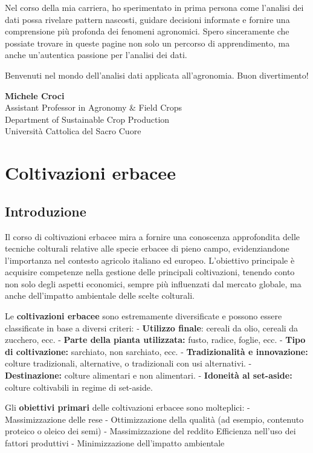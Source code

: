 \documentclass[
]{book}
\theoremstyle{definition}
\theoremstyle{definition}
\theoremstyle{definition}
\theoremstyle{definition}
\theoremstyle{remark}
\begin{document}
Nel corso della mia carriera, ho sperimentato in prima persona come l'analisi dei dati possa rivelare pattern nascosti, guidare decisioni informate e fornire una comprensione più profonda dei fenomeni agronomici. Spero sinceramente che possiate trovare in queste pagine non solo un percorso di apprendimento, ma anche un'autentica passione per l'analisi dei dati.

Benvenuti nel mondo dell'analisi dati applicata all'agronomia. Buon divertimento!

\textbf{Michele Croci}\\
Assistant Professor in Agronomy \& Field Crops\\
Department of Sustainable Crop Production\\
Università Cattolica del Sacro Cuore

\hypertarget{coltivazioni-erbacee}{%
\chapter{Coltivazioni erbacee}\label{coltivazioni-erbacee}}

\hypertarget{introduzione}{%
\section{Introduzione}\label{introduzione}}

Il corso di coltivazioni erbacee mira a fornire una conoscenza approfondita delle tecniche colturali relative alle specie erbacee di pieno campo, evidenziandone l'importanza nel contesto agricolo italiano ed europeo. L'obiettivo principale è acquisire competenze nella gestione delle principali coltivazioni, tenendo conto non solo degli aspetti economici, sempre più influenzati dal mercato globale, ma anche dell'impatto ambientale delle scelte colturali.

Le \textbf{coltivazioni erbacee} sono estremamente diversificate e possono essere classificate in base a diversi criteri: - \textbf{Utilizzo finale}: cereali da olio, cereali da zucchero, ecc. - \textbf{Parte della pianta utilizzata:} fusto, radice, foglie, ecc. - \textbf{Tipo di coltivazione:} sarchiato, non sarchiato, ecc. - \textbf{Tradizionalità e innovazione:} colture tradizionali, alternative, o tradizionali con usi alternativi. - \textbf{Destinazione:} colture alimentari e non alimentari. - \textbf{Idoneità al set-aside:} colture coltivabili in regime di set-aside.

Gli \textbf{obiettivi primari} delle coltivazioni erbacee sono molteplici: - Massimizzazione delle rese - Ottimizzazione della qualità (ad esempio, contenuto proteico o oleico dei semi) - Massimizzazione del reddito Efficienza nell'uso dei fattori produttivi - Minimizzazione dell'impatto ambientale
\end{document}
